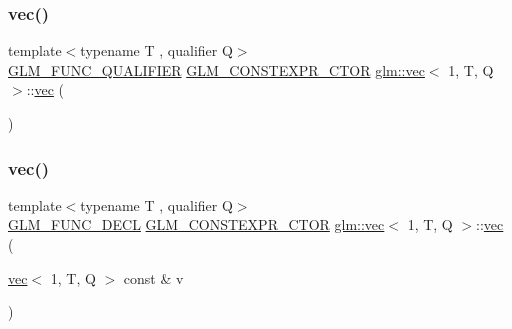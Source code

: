 \subsubsection{\texorpdfstring{vec()}{vec()}\hspace{0.1cm}{\footnotesize\ttfamily [1/14]}}
{\footnotesize\ttfamily template$<$typename T , qualifier Q$>$ \\
\mbox{\hyperlink{setup_8hpp_a33fdea6f91c5f834105f7415e2a64407}{G\+L\+M\+\_\+\+F\+U\+N\+C\+\_\+\+Q\+U\+A\+L\+I\+F\+I\+ER}} \mbox{\hyperlink{setup_8hpp_ad34178a09666081abdb573c14d1f4a5a}{G\+L\+M\+\_\+\+C\+O\+N\+S\+T\+E\+X\+P\+R\+\_\+\+C\+T\+OR}} \mbox{\hyperlink{structglm_1_1vec}{glm\+::vec}}$<$ 1, T, Q $>$\+::\mbox{\hyperlink{structglm_1_1vec}{vec}} (\begin{DoxyParamCaption}{ }\end{DoxyParamCaption})}

\mbox{\label{structglm_1_1vec_3_011_00_01_t_00_01_q_01_4_ac61412a4328fca49ded68a788eee5385}} 
\subsubsection{\texorpdfstring{vec()}{vec()}\hspace{0.1cm}{\footnotesize\ttfamily [2/14]}}
{\footnotesize\ttfamily template$<$typename T , qualifier Q$>$ \\
\mbox{\hyperlink{setup_8hpp_ab2d052de21a70539923e9bcbf6e83a51}{G\+L\+M\+\_\+\+F\+U\+N\+C\+\_\+\+D\+E\+CL}} \mbox{\hyperlink{setup_8hpp_ad34178a09666081abdb573c14d1f4a5a}{G\+L\+M\+\_\+\+C\+O\+N\+S\+T\+E\+X\+P\+R\+\_\+\+C\+T\+OR}} \mbox{\hyperlink{structglm_1_1vec}{glm\+::vec}}$<$ 1, T, Q $>$\+::\mbox{\hyperlink{structglm_1_1vec}{vec}} (\begin{DoxyParamCaption}\item[{\mbox{\hyperlink{structglm_1_1vec}{vec}}$<$ 1, T, Q $>$ const \&}]{v }\end{DoxyParamCaption})}

\mbox{\label{structglm_1_1vec_3_011_00_01_t_00_01_q_01_4_a335f0b237f2efd588837a62b9a8e7306}} 
